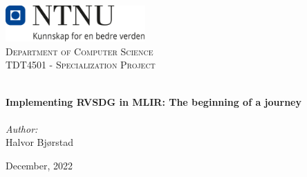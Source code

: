 
\begin{titlepage}
\vbox{ }
\vbox{ }
\begin{center}
\includegraphics[width=0.40\textwidth]{Images/NTNU_logo.png}\\[1cm]
\textsc{\LARGE Department of Computer Science}\\[1.5cm]
\textsc{\Large TDT4501 - Specialization Project}\\[0.5cm]
\vbox{ }

\HRule \\[0.4cm]
{ \huge \bfseries Implementing RVSDG in MLIR: The beginning of a journey}\\[0.4cm]
\HRule \\[1.5cm]

\large
\emph{Author:}\\
Halvor Bjørstad
\vfill

{\large December, 2022}
\end{center}
\end{titlepage}